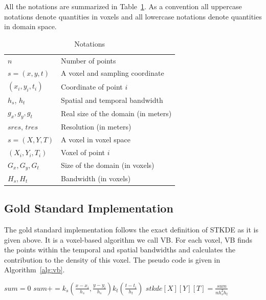 \documentclass[10pt, conference, compsocconf]{IEEEtran}
\begin{document}
All the notations are summarized in Table~\ref{tab:notation}. As a
convention all uppercase notations denote quantities in voxels and all
lowercase notations denote quantities in domain space.

\begin{table}
  \centering
  \begin{tabular}{|l|l|}
    \hline 
    $n$ & Number of points\\
    $s = (x,y,t)$ & A voxel and sampling coordinate\\
    $(x_i, y_i, t_i)$ & Coordinate of point $i$\\
    $h_s$, $h_t$ & Spatial and temporal bandwidth \\ 
    $g_x, g_y, g_t$ & Real size of the domain (in meters) \\
    \hline
    $sres$, $tres$ & Resolution (in meters) \\
    $s = (X,Y,T)$ & A voxel in voxel space\\
    $(X_i, Y_i, T_i)$ & Voxel of point $i$\\
    $G_x, G_y, G_t$ & Size of the domain (in voxels)\\
    $H_s, H_t$ & Bandwidth (in voxels) \\
    \hline 
  \end{tabular}
  \caption{Notations}
  \label{tab:notation}
\end{table}



\subsection{Gold Standard Implementation}

The gold standard implementation follows the exact definition of STKDE
as it is given above. It is a voxel-based algorithm we call VB. For
each voxel, VB finds the points within the temporal and spatial bandwidths and calculates the contribution
to the density of this voxel. The pseudo code is given in Algorithm~\ref{alg:vb}.

\begin{algorithm}
\caption{\textsc{VB}}
\scriptsize
\begin{algorithmic}
\State $sum = 0$
    \State $sum += k_s(\frac{x-x_i}{h_s},\frac{y-y_i}{h_s}) k_t(\frac{t-t_i}{h_t})$
    \EndIf
  \EndFor
  \State $stkde[X][Y][T] = \frac{sum}{n h_s^2h_t}$
\EndFor
\end{algorithmic}
\label{alg:vb}
\end{algorithm}
\end{document}
